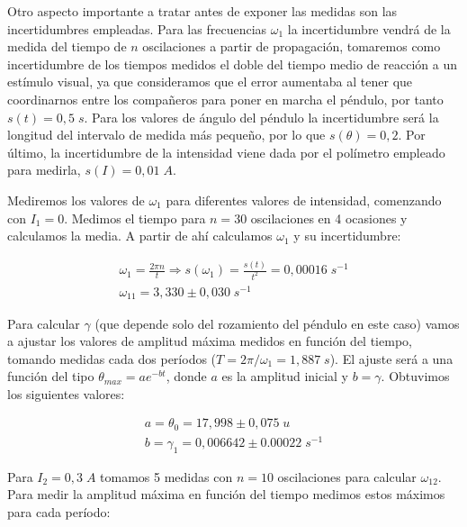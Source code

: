 \documentclass[a4paper,12pt,titlepage]{article}
\begin{document}
\par Otro aspecto importante a tratar antes de exponer las medidas son las incertidumbres empleadas. Para las frecuencias $\omega_1$ la incertidumbre vendrá de la medida del tiempo de $n$ oscilaciones a partir de propagación, tomaremos como incertidumbre de los tiempos medidos el doble del tiempo medio de reacción a un estímulo visual, ya que consideramos que el error aumentaba al tener que coordinarnos entre los compañeros para poner en marcha el péndulo, por tanto $s(t)=0,5\; s$. Para los valores de ángulo del péndulo la incertidumbre será la longitud del intervalo de medida más pequeño, por lo que $s(\theta)=0,2$. Por último, la incertidumbre de la intensidad viene dada por el polímetro empleado para medirla, $s(I)=0,01\;A$.

\par Mediremos los valores de $\omega_1$ para diferentes valores de intensidad, comenzando con $I_1=0$. Medimos el tiempo para $n=30$ oscilaciones en 4 ocasiones y calculamos la media. A partir de ahí calculamos $\omega_1$ y su incertidumbre:

\begin{equation}
    \begin{gathered}
        \omega_{1} = \frac{2\pi n}{t} \Rightarrow s(\omega_1) = \frac{s(t)}{t^2}= 0,00016 \;s^{-1}\\
        \omega_{11} = 3,330 \pm 0,030 \;s^{-1}
    \end{gathered}
\end{equation}

Para calcular $\gamma$ (que depende solo del rozamiento del péndulo en este caso) vamos a ajustar los valores de amplitud máxima medidos en función del tiempo, tomando medidas cada dos períodos ($T=2\pi/\omega_1=1,887 \;s$). El ajuste será a una función del tipo $\theta_{max}=ae^{-bt}$, donde $a$ es la amplitud inicial y $b=\gamma$. Obtuvimos los siguientes valores:

\begin{equation}
    \begin{gathered}
        a = \theta_0 = 17,998\pm 0,075 \; u \\
        b = \gamma_1 = 0,006642 \pm  0.00022 \; s^{-1}
    \end{gathered}
\end{equation}

Para $I_2=0,3\;A$ tomamos 5 medidas con $n=10$ oscilaciones para calcular $\omega_{12}$. Para medir la amplitud máxima en función del tiempo medimos estos máximos para cada período:
\end{document}
